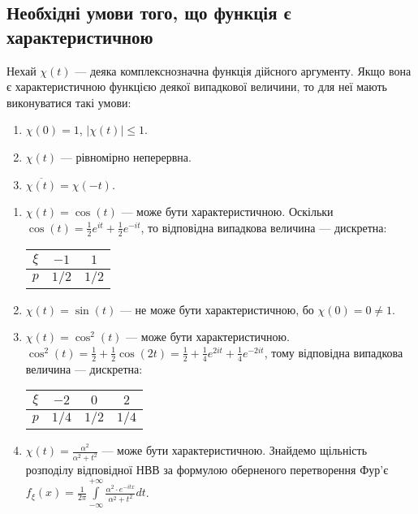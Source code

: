 \subsection{Необхідні умови того, що функція є характеристичною}
Нехай $\chi(t)$ --- деяка комплекснозначна функція дійсного аргументу.
Якщо вона є характеристичною функцією деякої випадкової величини, то для неї мають виконуватися такі умови:
\begin{enumerate}
    \item $\chi(0) = 1$, $\left| \chi(t)\right| \leq 1$.
    \item $\chi(t)$ --- рівномірно неперервна.
    \item $\overline{\chi(t)} = \chi(-t)$.
\end{enumerate}
\begin{example}
    \begin{enumerate}
        \item $\chi(t) = \cos(t)$ --- може бути характеристичною.
        Оскільки $\cos(t) = \frac{1}{2}e^{it} + \frac{1}{2}e^{-it}$, то відповідна випадкова величина --- дискретна:
        \begin{center}
            \begin{tabular}{|c|c|c|}
                \hline
                $\xi$ & $-1$ & $1$ \\
                \hline
                $p$ & $1/2$ & $1/2$ \\
                \hline
            \end{tabular}
        \end{center}
        \item $\chi(t) = \sin(t)$ --- не може бути характеристичною, бо $\chi(0) = 0 \neq 1$.
        \item $\chi(t) = \cos^2(t)$ --- може бути характеристичною.
        $\cos^2(t) = \frac{1}{2} + \frac{1}{2}\cos(2t) = \frac{1}{2} + \frac{1}{4}e^{2it} + \frac{1}{4}e^{-2it}$, тому
        відповідна випадкова величина --- дискретна:
        \begin{center}
            \begin{tabular}{|c|c|c|c|}
                \hline
                $\xi$ & $-2$ & $0$ & $2$ \\
                \hline
                $p$ & $1/4$ & $1/2$ & $1/4$ \\
                \hline
            \end{tabular}
        \end{center}
        \item $\chi(t) = \frac{\alpha^2}{\alpha^2 + t^2}$ --- може бути характеристичною. 
        Знайдемо щільність розподілу відповідної НВВ за формулою оберненого перетворення Фур'є $f_\xi(x) = \frac{1}{2\pi}\int\limits_{-\infty}^{+\infty} \frac{\alpha^2 \cdot e^{-itx}}{\alpha^2 + t^2} dt$.


\end{enumerate}
\end{example}

